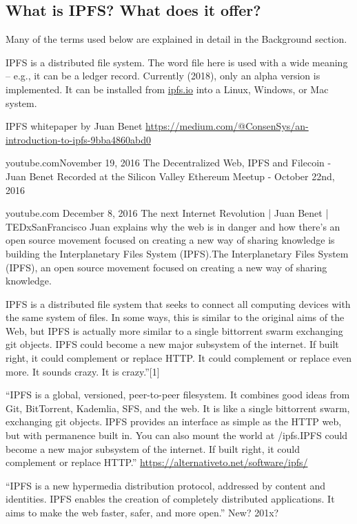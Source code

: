 \subsection{What is IPFS? What does it offer?}

Many of the terms used below are explained in detail in the Background
section.

IPFS is a distributed file system.  The word file here is used with a
wide meaning -- e.g., it can be a ledger record.  Currently (2018),
only an alpha version is implemented.  It can be installed from
\url{ipfs.io} into a Linux, Windows, or Mac system.

IPFS whitepaper by Juan Benet
\url{https://medium.com/@ConsenSys/an-introduction-to-ipfs-9bba4860abd0}

youtube.comNovember 19, 2016
The Decentralized Web, IPFS and Filecoin - Juan Benet
Recorded at the Silicon Valley Ethereum Meetup - October 22nd, 2016

youtube.com December 8, 2016 The next Internet Revolution | Juan Benet
| TEDxSanFrancisco Juan explains why the web is in danger and how
there's an open source movement focused on creating a new way of
sharing knowledge is building the Interplanetary Files System
(IPFS).The Interplanetary Files System (IPFS), an open source movement
focused on creating a new way of sharing knowledge.

IPFS is a distributed file system that seeks to connect all computing
devices with the same system of files.  In some ways, this is similar
to the original aims of the Web, but IPFS is actually more similar to
a single bittorrent swarm exchanging git objects. IPFS could become a
new major subsystem of the internet. If built right, it could
complement or replace HTTP. It could complement or replace even
more. It sounds crazy. It is crazy.”[1]

``IPFS is a global, versioned, peer-to-peer filesystem. It combines
good ideas from Git, BitTorrent, Kademlia, SFS, and the web. It is
like a single bittorrent swarm, exchanging git objects. IPFS provides
an interface as simple as the HTTP web, but with permanence built
in. You can also mount the world at /ipfs.IPFS could become a new
major subsystem of the internet. If built right, it could complement
or replace HTTP.''
\url{https://alternativeto.net/software/ipfs/}

``IPFS is a new hypermedia distribution protocol, addressed by content and identities. IPFS enables the creation of completely distributed applications. It aims to make the web faster, safer, and more open.''
New? 201x?

